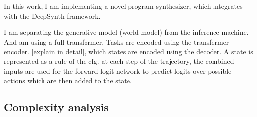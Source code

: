 In this work, I am implementing a novel program synthesizer, which integrates with the DeepSynth framework. 

I am separating the generative model (world model) from the inference machine. And am using a full transformer.
Tasks are encoded using the transformer encoder. [explain in detail], which states are encoded using the decoder. A state is represented as a rule of the cfg.
at each step of the trajectory, the combined inputs are used for the forward logit network to predict logits over possible actions which are then added to the state.


\subsection{Complexity analysis}
